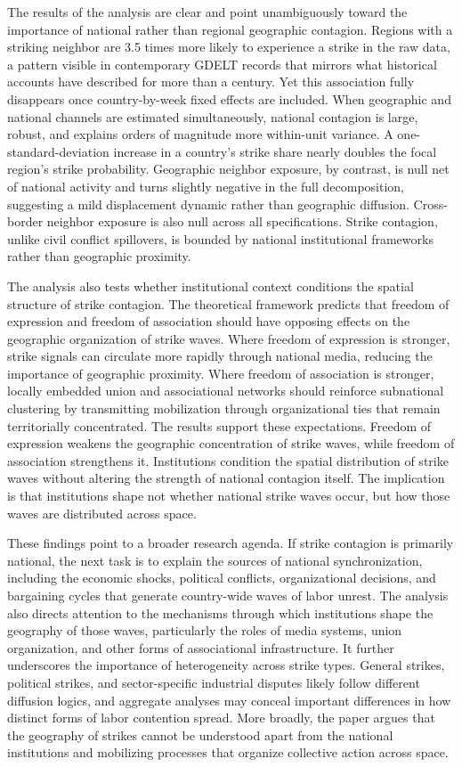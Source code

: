 \documentclass[
  11pt,
]{article}
\begin{document}
The results of the analysis are clear and point unambiguously toward the
importance of national rather than regional geographic contagion.
Regions with a striking neighbor are 3.5 times more likely to experience
a strike in the raw data, a pattern visible in contemporary GDELT
records that mirrors what historical accounts have described for more
than a century. Yet this association fully disappears once
country-by-week fixed effects are included. When geographic and national
channels are estimated simultaneously, national contagion is large,
robust, and explains orders of magnitude more within-unit variance. A
one-standard-deviation increase in a country's strike share nearly
doubles the focal region's strike probability. Geographic neighbor
exposure, by contrast, is null net of national activity and turns
slightly negative in the full decomposition, suggesting a mild
displacement dynamic rather than geographic diffusion. Cross-border
neighbor exposure is also null across all specifications. Strike
contagion, unlike civil conflict spillovers, is bounded by national
institutional frameworks rather than geographic proximity.

The analysis also tests whether institutional context conditions the
spatial structure of strike contagion. The theoretical framework
predicts that freedom of expression and freedom of association should
have opposing effects on the geographic organization of strike waves.
Where freedom of expression is stronger, strike signals can circulate
more rapidly through national media, reducing the importance of
geographic proximity. Where freedom of association is stronger, locally
embedded union and associational networks should reinforce subnational
clustering by transmitting mobilization through organizational ties that
remain territorially concentrated. The results support these
expectations. Freedom of expression weakens the geographic concentration
of strike waves, while freedom of association strengthens it.
Institutions condition the spatial distribution of strike waves without
altering the strength of national contagion itself. The implication is
that institutions shape not whether national strike waves occur, but how
those waves are distributed across space.

These findings point to a broader research agenda. If strike contagion
is primarily national, the next task is to explain the sources of
national synchronization, including the economic shocks, political
conflicts, organizational decisions, and bargaining cycles that generate
country-wide waves of labor unrest. The analysis also directs attention
to the mechanisms through which institutions shape the geography of
those waves, particularly the roles of media systems, union
organization, and other forms of associational infrastructure. It
further underscores the importance of heterogeneity across strike types.
General strikes, political strikes, and sector-specific industrial
disputes likely follow different diffusion logics, and aggregate
analyses may conceal important differences in how distinct forms of
labor contention spread. More broadly, the paper argues that the
geography of strikes cannot be understood apart from the national
institutions and mobilizing processes that organize collective action
across space.
\end{document}
